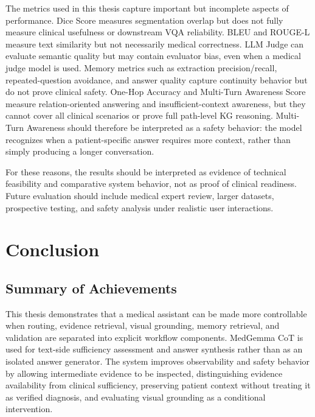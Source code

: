 The metrics used in this thesis capture important but incomplete aspects of performance. Dice Score measures segmentation overlap but does not fully measure clinical usefulness or downstream VQA reliability. BLEU and ROUGE-L measure text similarity but not necessarily medical correctness. LLM Judge can evaluate semantic quality but may contain evaluator bias, even when a medical judge model is used. Memory metrics such as extraction precision/recall, repeated-question avoidance, and answer quality capture continuity behavior but do not prove clinical safety. One-Hop Accuracy and Multi-Turn Awareness Score measure relation-oriented answering and insufficient-context awareness, but they cannot cover all clinical scenarios or prove full path-level KG reasoning. Multi-Turn Awareness should therefore be interpreted as a safety behavior: the model recognizes when a patient-specific answer requires more context, rather than simply producing a longer conversation.

For these reasons, the results should be interpreted as evidence of technical feasibility and comparative system behavior, not as proof of clinical readiness. Future evaluation should include medical expert review, larger datasets, prospective testing, and safety analysis under realistic user interactions.

\section{Conclusion}

\subsection{Summary of Achievements}

This thesis demonstrates that a medical assistant can be made more controllable when routing, evidence retrieval, visual grounding, memory retrieval, and validation are separated into explicit workflow components. MedGemma CoT is used for text-side sufficiency assessment and answer synthesis rather than as an isolated answer generator. The system improves observability and safety behavior by allowing intermediate evidence to be inspected, distinguishing evidence availability from clinical sufficiency, preserving patient context without treating it as verified diagnosis, and evaluating visual grounding as a conditional intervention.

